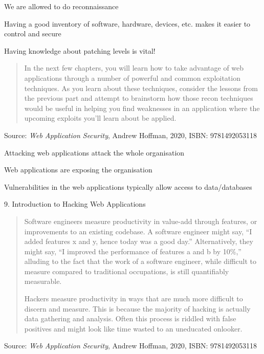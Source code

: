 \documentclass[Screen16to9,17pt]{foils}
\newcommand{\quotesize}{\fontsize{16pt}{20pt}\selectfont}
\begin{document}
\begin{list2}
\item We are allowed to do reconnaissance
\item Having a good inventory of software, hardware, devices, etc. makes it easier to control and secure
\item Having knowledge about patching levels is vital!
\end{list2}




\begin{quote}\quotesize
  In the next few chapters, you will learn how to take advantage of web applications
  through a number of powerful and common exploitation techniques. As you learn
  about these techniques, consider the lessons from the previous part and attempt to
  brainstorm how those recon techniques would be useful in helping you find weaknesses in an application where the upcoming exploits you’ll learn about be applied.
\end{quote}
Source: \emph{Web Application Security}, Andrew Hoffman, 2020, ISBN: 9781492053118

\begin{list2}
\item Attacking web applications attack the whole organisation
\item Web applications are exposing the organisation
\item Vulnerabilities in the web applications typically allow access to data/databases
\end{list2}




{\large 9. Introduction to Hacking Web Applications}

\begin{quote}\quotesize
Software engineers measure productivity in value-add through features, or improvements to an existing codebase. A software engineer might say, “I added features x and y, hence today was a good day.” Alternatively, they might say, “I improved the performance of features a and b by 10\%,” alluding to the fact that the work of a software engineer, while difficult to measure compared to traditional occupations, is still quantifiably measurable.

Hackers measure productivity in ways that are much more difficult to discern and measure. This is because the majority of hacking is actually data gathering and analysis. Often this process is riddled with false positives and might look like time wasted to an uneducated onlooker.
\end{quote}
Source: \emph{Web Application Security}, Andrew Hoffman, 2020, ISBN: 9781492053118
\end{document}
